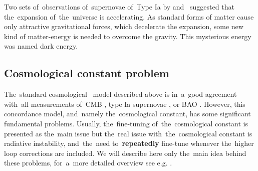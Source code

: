 Two sets of~observations of~supernovae of~Type Ia by \textcite{riess} and~\textcite{1999ApJ...517..565P} suggested that the~expansion of~the~universe is accelerating. As standard forms of matter cause only attractive gravitational forces, which decelerate the expansion, some new kind of matter-energy is needed to overcome the gravity. This mysterious energy was named dark energy.

\subsection{Cosmological constant problem}
\label{ssec:lambda}
The~standard cosmological \LCDM\ model described above is in~a~good agreement with~all measurements of~CMB \parencite{planck_cosm}, type Ia supernovae \parencite{Abbott_2019}, or BAO \parencite{BAO_results}. However, this concordance model, and~namely the~cosmological constant, has some significant fundamental problems. Usually, the~fine-tuning of~the~cosmological constant is presented as the~main issue but the~real issue with~the~cosmological constant is radiative instability, and~the~need to~\textbf{repeatedly} fine-tune whenever the~higher loop corrections are included. We will describe here only the~main idea behind these problems, for~a~more detailed overview see e.g. \textcite{2015arXiv150205296P,2012CRPhy..13..566M}.

